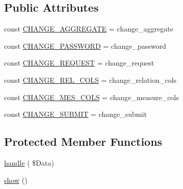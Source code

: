 \subsection*{Public Attributes}
\begin{DoxyCompactItemize}
\item 
const \hyperlink{class_page_change_aggregate_abd690986025a0248cd4ad2e13b620853}{C\+H\+A\+N\+G\+E\+\_\+\+A\+G\+G\+R\+E\+G\+A\+TE} = \textquotesingle{}change\+\_\+aggregate\textquotesingle{}
\item 
const \hyperlink{class_page_change_aggregate_ab004bbd3e82290f0f37c547438719b3b}{C\+H\+A\+N\+G\+E\+\_\+\+P\+A\+S\+S\+W\+O\+RD} = \textquotesingle{}change\+\_\+password\textquotesingle{}
\item 
const \hyperlink{class_page_change_aggregate_a264cf30be29059963937cd1749f527c2}{C\+H\+A\+N\+G\+E\+\_\+\+R\+E\+Q\+U\+E\+ST} = \textquotesingle{}change\+\_\+request\textquotesingle{}
\item 
const \hyperlink{class_page_change_aggregate_ab4a3e31f01bcc8a1be0fc7b0938bca8b}{C\+H\+A\+N\+G\+E\+\_\+\+R\+E\+L\+\_\+\+C\+O\+LS} = \textquotesingle{}change\+\_\+relation\+\_\+cols\textquotesingle{}
\item 
const \hyperlink{class_page_change_aggregate_ab34fb39084f70b5581037b3a59d15a4a}{C\+H\+A\+N\+G\+E\+\_\+\+M\+E\+S\+\_\+\+C\+O\+LS} = \textquotesingle{}change\+\_\+measure\+\_\+cols\textquotesingle{}
\item 
const \hyperlink{class_page_change_aggregate_aa0f81f7c8157895d6478e34cea27dc31}{C\+H\+A\+N\+G\+E\+\_\+\+S\+U\+B\+M\+IT} = \textquotesingle{}change\+\_\+submit\textquotesingle{}
\end{DoxyCompactItemize}
\subsection*{Protected Member Functions}
\begin{DoxyCompactItemize}
\item 
\hyperlink{class_page_change_aggregate_a9aa7ddde1d298c61ecca29c42f99a4c7}{handle} ( \$Data)
\item 
\hyperlink{class_page_change_aggregate_ace6ee8ccecde93fa027574965d32b471}{show} ()
\end{DoxyCompactItemize}
